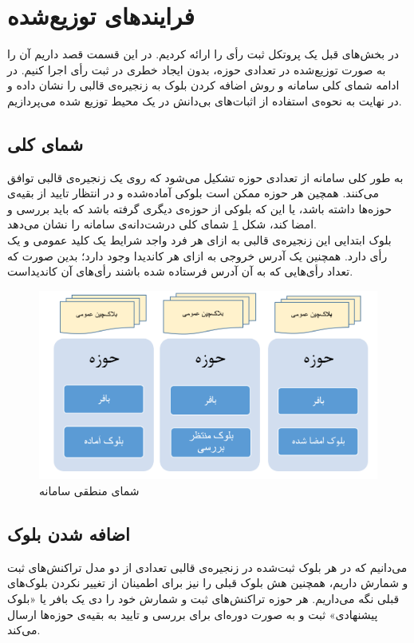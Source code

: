\section{فرایند‌های توزیع‌شده}
در بخش‌های قبل یک پروتکل ثبت رأی‌ را ارائه کردیم. در این قسمت قصد داریم آن را به صورت توزیع‌شده در تعدادی حوزه، بدون ایجاد خطری در ثبت رأی اجرا کنیم. در ادامه شمای کلی سامانه و روش‌ اضافه کردن بلوک به زنجیره‌ی قالبی را نشان داده و در نهایت به نحوه‌ی استفاده از اثبات‌های بی‌دانش در یک محیط توزیع شده می‌پردازیم.
\subsection{شمای کلی}
به طور کلی سامانه از تعدادی حوزه‌ تشکیل می‌شود که روی یک زنجیره‌ی قالبی توافق می‌کنند. همچین هر حوزه ممکن است بلوکی آماده‌شده و در انتظار تایید از بقیه‌ی حوزه‌ها داشته باشد، یا این که بلوکی از حوزه‌ی دیگری گرفته باشد که باید بررسی و امضا کند، شکل \ref{fig:bigpic} شمای کلی درشت‌دانه‌ی سامانه را نشان می‌دهد.
\\
بلوک ابتدایی این زنجیره‌ی قالبی به ازای هر فرد واجد شرایط یک کلید عمومی و یک رأی ‌دارد. همچنین یک آدرس خروجی به ازای هر کاندیدا وجود دارد؛ بدین صورت که تعداد رأی‌هایی که به آن آدرس فرستاده شده باشند رأی‌های آن‌ کاندیداست. 
 
\begin{figure}[th]
	\centering
	\includegraphics[width=1\linewidth]{blockchain.PNG}
	\caption {شمای منطقی سامانه}
	\label{fig:bigpic}
\end{figure}

\subsection{اضافه شدن بلوک}
می‌دانیم که در هر بلوک ثبت‌شده در زنجیره‌ی قالبی تعدادی از دو مدل تراکنش‌های ثبت و شمارش داریم، همچنین هش بلوک قبلی را نیز برای اطمینان از تغییر نکردن بلوک‌های قبلی نگه ‌می‌داریم. هر حوزه تراکنش‌های ثبت و شمارش خود را دی یک بافر
یا «بلوک پیشنهادی» ثبت و به صورت دوره‌ای برای بررسی و تایید به بقیه‌ی حوزه‌ها ارسال می‌کند. 

